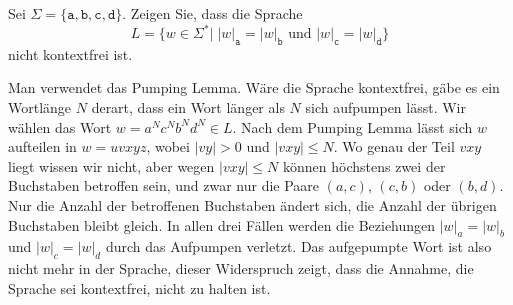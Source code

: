 Sei $\Sigma=\{\texttt{a},\texttt{b},\texttt{c},\texttt{d}\}$.
Zeigen Sie, dass die Sprache
\[
L=\{w\in\Sigma^*|\;\text{$|w|_\texttt{a}=|w|_\texttt{b}$ und $|w|_\texttt{c}=|w|_\texttt{d}$}\}
\]
nicht kontextfrei ist.


\begin{loesung}
Man verwendet das Pumping Lemma.
Wäre die Sprache kontextfrei,
gäbe
es ein Wortlänge $N$ derart, dass ein Wort länger als $N$ sich
aufpumpen lässt.
Wir wählen das Wort $w=a^Nc^Nb^Nd^N\in L$.
Nach dem Pumping
Lemma lässt sich $w$ aufteilen in
$w = uvxyz$, wobei $|vy|>0$ und $|vxy|\le N$.
Wo genau der Teil
$vxy$ liegt wissen wir nicht, aber wegen $|vxy|\le N$ können
höchstens zwei der Buchstaben betroffen sein, und
zwar nur die Paare $(a,c)$, $(c,b)$ oder $(b,d)$.
Nur die Anzahl
der betroffenen Buchstaben ändert sich, die Anzahl der übrigen
Buchstaben bleibt gleich.
In allen drei Fällen werden die
Beziehungen $|w|_a=|w|_b$ und $|w|_c=|w|_d$ durch das Aufpumpen verletzt.
Das aufgepumpte Wort ist also nicht mehr in der Sprache, dieser Widerspruch
zeigt, dass die Annahme, die Sprache sei kontextfrei, nicht zu halten ist.
\end{loesung}
